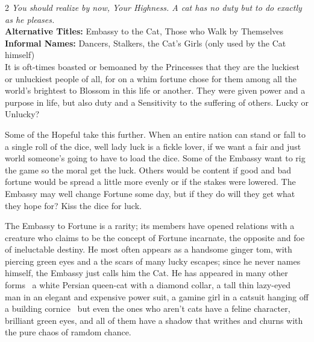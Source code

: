 \begin{multicols}{2}
\textit{You should realize by now, Your Highness. A cat has no duty but to do exactly as he pleases.}\\

\noindent \textbf{Alternative Titles:} Embassy to the Cat, Those who Walk by Themselves\\

\noindent \textbf{Informal Names:} Dancers, Stalkers, the Cat's Girls (only used by the Cat himself) \\

\noindent It is oft-times boasted or bemoaned by the Princesses that they are the luckiest or unluckiest people of all, for on a whim fortune chose for them among all the world's brightest to Blossom in this life or another. They were given power and a purpose in life, but also duty and a Sensitivity to the suffering of others. Lucky or Unlucky? 

Some of the Hopeful take this further. When an entire nation can stand or fall to a single roll of the dice, well lady luck is a fickle lover, if we want a fair and just world someone's going to have to load the dice. Some of the Embassy want to rig the game so the moral get the luck. Others would be content if good and bad fortune would be spread a little more evenly or if the stakes were lowered. The Embassy may well change Fortune some day, but if they do will they get what they hope for? Kiss the dice for luck.

The Embassy to Fortune is a rarity; its members have opened relations with a creature who claims to be the concept of Fortune incarnate, the opposite and foe of ineluctable destiny. He most often appears as a handsome ginger tom, with piercing green eyes and a the scars of many lucky escapes; since he never names himself, the Embassy just calls him the Cat. He has appeared in many other forms \textendash\, a white Persian queen-cat with a diamond collar, a tall thin lazy-eyed man in an elegant and expensive power suit, a gamine girl in a catsuit hanging off a building cornice \textendash\, but even the ones who aren't cats have a feline character, brilliant green eyes, and all of them have a shadow that writhes and churns with the pure chaos of ramdom chance.


\end{multicols}

